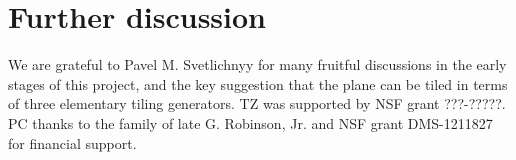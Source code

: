 \documentclass[aps,pre,
                showpacs,
                twocolumn,
                groupedaddress,
                floatfix]{revtex4-1}
\begin{document}
\section{Further discussion}


\begin{acknowledgments}
We are grateful to Pavel M. Svetlichnyy for many fruitful discussions in the
early stages of this project, and the key suggestion that the plane can be tiled
in terms of three elementary tiling generators. TZ was supported by NSF grant
???-?????. PC thanks to the family of late G. Robinson, Jr. and NSF grant
DMS-1211827 for financial support.
\end{acknowledgments}

\ifboyscout
\newpage
    
\fi




% 
\end{document}

